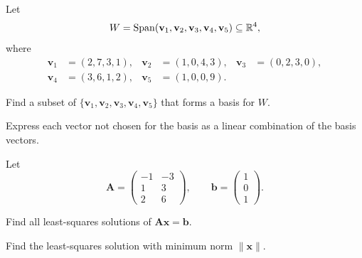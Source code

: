 \begin{problem}
Let
\[
W=\operatorname{Span}(\mathbf v_1,\mathbf v_2,\mathbf v_3,\mathbf v_4,\mathbf v_5)\subseteq\mathbb{R}^4,
\]
where
\[
\begin{aligned}
\mathbf v_1&=(2,7,3,1),&
\mathbf v_2&=(1,0,4,3),&
\mathbf v_3&=(0,2,3,0),\\
\mathbf v_4&=(3,6,1,2),&
\mathbf v_5&=(1,0,0,9).
\end{aligned}
\]
\begin{problemsubparts}
\item Find a subset of $\{\mathbf v_1,\mathbf v_2,\mathbf v_3,\mathbf v_4,\mathbf v_5\}$ that forms a basis for $W$.
\item Express each vector not chosen for the basis as a linear combination of the basis vectors.
\end{problemsubparts}
\end{problem}

\begin{problem}
Let
\[
\mathbf A=
\begin{pmatrix}
-1&-3\\
1&3\\
2&6
\end{pmatrix},
\qquad
\mathbf b=
\begin{pmatrix}1\\0\\1\end{pmatrix}.
\]
\begin{problemsubparts}
\item Find all least-squares solutions of $\mathbf A\mathbf x=\mathbf b$.
\item Find the least-squares solution with minimum norm $\|\mathbf x\|$.
\end{problemsubparts}
\end{problem}

